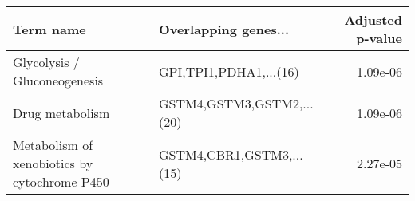 \begin{tabular}{llr}
\toprule
                                   Term name &      Overlapping genes... &  Adjusted p-value \\
\midrule
                Glycolysis / Gluconeogenesis &    GPI,TPI1,PDHA1,...(16) &          1.09e-06 \\
                             Drug metabolism & GSTM4,GSTM3,GSTM2,...(20) &          1.09e-06 \\
Metabolism of xenobiotics by cytochrome P450 &  GSTM4,CBR1,GSTM3,...(15) &          2.27e-05 \\
\bottomrule
\end{tabular}
